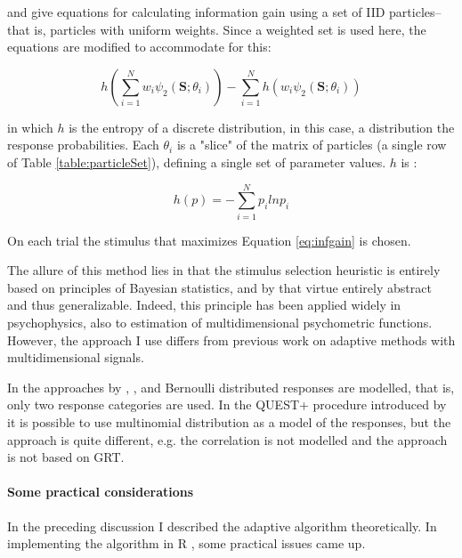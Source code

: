 \documentclass{article}\usepackage{knitr}
\begin{document}
\citet{kujalalukka2006} and \citet{kujala2011} give equations for calculating information gain using a set of IID particles--that is, particles with uniform weights. Since a weighted set is used here, the equations are modified to accommodate for this:

\begin{equation}
h(\sum_{i=1}^N w_i \psi_2(\bm{S};\theta_i)) - \sum_{i=1}^N h(w_i \psi_2(\bm{S};\theta_i)) 
\label{eq:infgain}
\end{equation}

in which $h$ is the entropy of a discrete distribution, in this case, a distribution the response probabilities. Each $\theta_i$ is a "slice" of the matrix of particles (a single  row of Table \ref{table:particleSet}), defining a single set of parameter values. $h$ is \citep{kontsevichtyler1999}:

\begin{equation}
h(p) = -\sum_{i = 1}^{N} p_i ln p_i
\end{equation}

On each trial the stimulus that maximizes Equation \ref{eq:infgain} is chosen. 

The allure of this method lies in that the stimulus selection heuristic is entirely based on principles of Bayesian statistics, and by that virtue entirely abstract and thus generalizable. Indeed, this principle has been applied widely in psychophysics, also to estimation of multidimensional psychometric functions. However, the approach I use differs from previous work on adaptive methods with multidimensional signals. 

In the approaches by \citet{dimattina2015}, \citet{lesmes2006}, \citet{shen2013, shen2014} and \citet{kujalalukka2006} Bernoulli distributed responses are modelled, that is, only two response categories are used. In the QUEST+ procedure introduced by \citet{watson2017} it is possible to use multinomial distribution as a model of the responses, but the approach is quite different, e.g. the correlation is not modelled and the approach is not based on GRT. 

\paragraph{Some practical considerations}
\label{sec:practical_considerations}

In the preceding discussion I described the adaptive algorithm theoretically. In implementing the algorithm in R \citep{r_language}, some practical issues came up. 
\end{document}
